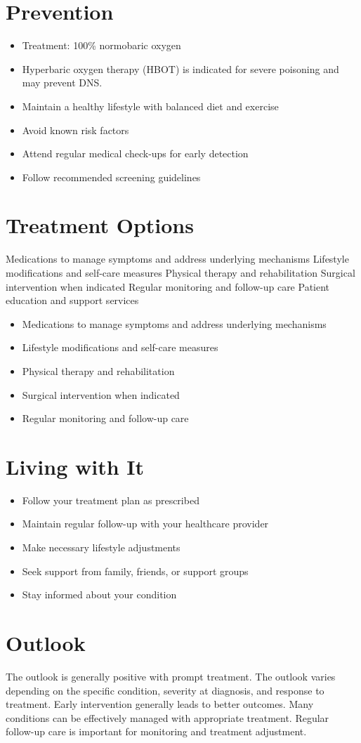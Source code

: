 \section{Prevention}
\begin{itemize}[noitemsep]
  \item Treatment: 100\% normobaric oxygen
  \item Hyperbaric oxygen therapy (HBOT) is indicated for severe poisoning and may prevent DNS.
  \item Maintain a healthy lifestyle with balanced diet and exercise
  \item Avoid known risk factors
  \item Attend regular medical check-ups for early detection
  \item Follow recommended screening guidelines
\end{itemize}
\section{Treatment Options}
Medications to manage symptoms and address underlying mechanisms Lifestyle modifications and self-care measures Physical therapy and rehabilitation Surgical intervention when indicated Regular monitoring and follow-up care Patient education and support services

\begin{itemize}[noitemsep]
  \item Medications to manage symptoms and address underlying mechanisms
  \item Lifestyle modifications and self-care measures
  \item Physical therapy and rehabilitation
  \item Surgical intervention when indicated
  \item Regular monitoring and follow-up care
\end{itemize}
\section{Living with It}
\begin{itemize}[noitemsep]
  \item Follow your treatment plan as prescribed
  \item Maintain regular follow-up with your healthcare provider
  \item Make necessary lifestyle adjustments
  \item Seek support from family, friends, or support groups
  \item Stay informed about your condition
\end{itemize}
\section{Outlook}
The outlook is generally positive with prompt treatment. The outlook varies depending on the specific condition, severity at diagnosis, and response to treatment. Early intervention generally leads to better outcomes. Many conditions can be effectively managed with appropriate treatment. Regular follow-up care is important for monitoring and treatment adjustment.
